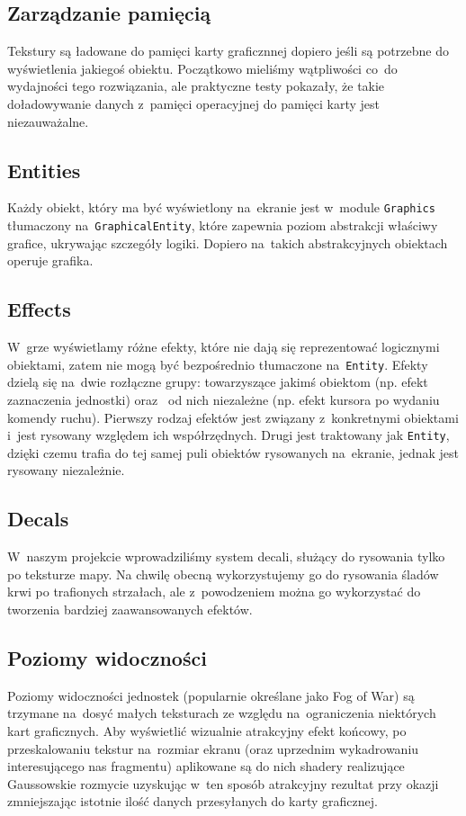 \documentclass[licencjacka]{pracamgr}
\begin{document}
    \subsection{Zarządzanie pamięcią}
      Tekstury są ładowane do pamięci karty graficznnej dopiero jeśli są potrzebne do wyświetlenia jakiegoś
      obiektu. Początkowo mieliśmy wątpliwości co~do wydajności tego rozwiązania, ale praktyczne testy pokazały, że
      takie doładowywanie danych z~pamięci operacyjnej do pamięci karty jest niezauważalne.

    \subsection{Entities}
      Każdy obiekt, który ma być wyświetlony na~ekranie jest w~module \texttt{Graphics} tłumaczony na~\texttt{GraphicalEntity}, które
      zapewnia poziom abstrakcji właściwy grafice, ukrywając szczegóły logiki. Dopiero na~takich abstrakcyjnych obiektach operuje grafika.

    \subsection{Effects}
      W~grze wyświetlamy różne efekty, które nie dają się reprezentować logicznymi obiektami, zatem nie mogą być bezpośrednio tłumaczone
      na~\texttt{Entity}. Efekty dzielą się na~dwie rozłączne grupy: towarzyszące jakimś obiektom (np. efekt zaznaczenia jednostki) oraz~
      od nich niezależne (np. efekt kursora po wydaniu komendy ruchu). Pierwszy rodzaj efektów jest związany z~konkretnymi obiektami i~jest
      rysowany względem ich współrzędnych. Drugi jest traktowany jak \texttt{Entity}, dzięki czemu trafia do tej samej puli obiektów rysowanych
      na~ekranie, jednak jest rysowany niezależnie.

    \subsection{Decals}
      W~naszym projekcie wprowadziliśmy system decali, służący do rysowania tylko po teksturze mapy. Na chwilę obecną wykorzystujemy go do
      rysowania śladów krwi po trafionych strzałach, ale z~powodzeniem można go wykorzystać do tworzenia bardziej zaawansowanych efektów.

    \subsection{Poziomy widoczności}
      Poziomy widoczności jednostek (popularnie określane jako Fog of War) są trzymane na~dosyć małych teksturach ze względu na~ograniczenia
      niektórych kart graficznych. Aby wyświetlić wizualnie atrakcyjny efekt końcowy, po przeskalowaniu tekstur na~rozmiar ekranu
      (oraz uprzednim wykadrowaniu interesującego nas fragmentu) aplikowane są do nich shadery realizujące Gaussowskie rozmycie\cite{GB}
      uzyskując w~ten sposób atrakcyjny rezultat przy okazji zmniejszając istotnie ilość danych przesyłanych do karty graficznej.
\end{document}

